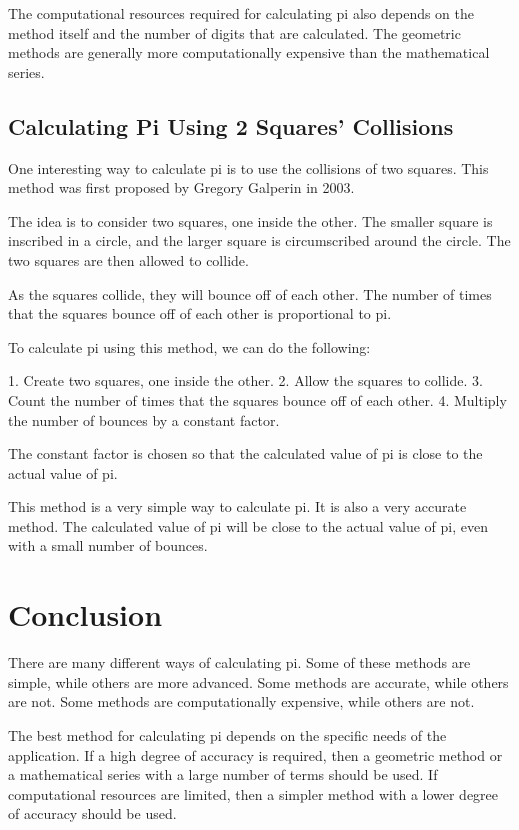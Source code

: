\documentclass{article}
\begin{document}
The computational resources required for calculating pi also depends on the method itself and the number of digits that are calculated. The geometric methods are generally more computationally expensive than the mathematical series.

\subsection{Calculating Pi Using 2 Squares' Collisions}

One interesting way to calculate pi is to use the collisions of two squares. This method was first proposed by Gregory Galperin in 2003.

The idea is to consider two squares, one inside the other. The smaller square is inscribed in a circle, and the larger square is circumscribed around the circle. The two squares are then allowed to collide.

As the squares collide, they will bounce off of each other. The number of times that the squares bounce off of each other is proportional to pi.

To calculate pi using this method, we can do the following:

1. Create two squares, one inside the other.
2. Allow the squares to collide.
3. Count the number of times that the squares bounce off of each other.
4. Multiply the number of bounces by a constant factor.

The constant factor is chosen so that the calculated value of pi is close to the actual value of pi.

This method is a very simple way to calculate pi. It is also a very accurate method. The calculated value of pi will be close to the actual value of pi, even with a small number of bounces.

\section{Conclusion}

There are many different ways of calculating pi. Some of these methods are simple, while others are more advanced. Some methods are accurate, while others are not. Some methods are computationally expensive, while others are not.

The best method for calculating pi depends on the specific needs of the application. If a high degree of accuracy is required, then a geometric method or a mathematical series with a large number of terms should be used. If computational resources are limited, then a simpler method with a lower degree of accuracy should be used.
\end{document}
